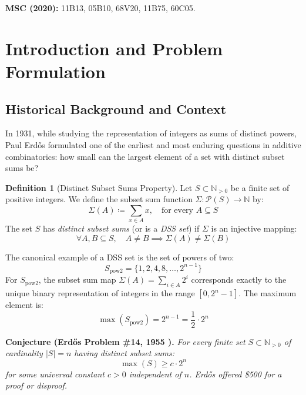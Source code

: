 \documentclass[11pt,a4paper]{article}
\theoremstyle{definition}
\newtheorem{definition}[theorem]{Definition}
\begin{document}
\noindent\textbf{MSC (2020):} 11B13, 05B10, 68V20, 11B75, 60C05.

\tableofcontents
\newpage

\section{Introduction and Problem Formulation}

\subsection{Historical Background and Context}
In 1931, while studying the representation of integers as sums of distinct powers, Paul Erd\H{o}s \cite{erdos1955} formulated one of the earliest and most enduring questions in additive combinatorics: how small can the largest element of a set with distinct subset sums be?

\begin{definition}[Distinct Subset Sums Property]\label{def:dss}
Let $S \subset \mathbb{N}_{>0}$ be a finite set of positive integers. We define the subset sum function $\Sigma : \mathcal{P}(S) \to \mathbb{N}$ by:
\begin{equation}\label{eq:subset_sum_def}
\Sigma(A) \coloneqq \sum_{x \in A} x, \quad \text{for every } A \subseteq S
\end{equation}
The set $S$ has \emph{distinct subset sums} (or is a \emph{DSS set}) if $\Sigma$ is an injective mapping:
\begin{equation}\label{eq:injectivity}
\forall A, B \subseteq S, \quad A \ne B \implies \Sigma(A) \ne \Sigma(B)
\end{equation}
\end{definition}

The canonical example of a DSS set is the set of powers of two:
\[ S_{\text{pow2}} = \{1, 2, 4, 8, \dots, 2^{n-1}\} \]
For $S_{\text{pow2}}$, the subset sum map $\Sigma(A) = \sum_{i \in A} 2^i$ corresponds exactly to the unique binary representation of integers in the range $[0, 2^n - 1]$. The maximum element is:
\[ \max(S_{\text{pow2}}) = 2^{n-1} = \frac{1}{2} \cdot 2^n \]

\noindent\textbf{Conjecture (Erd\H{o}s Problem \#14, 1955 \cite{erdos1955}).} \textit{For every finite set $S \subset \mathbb{N}_{>0}$ of cardinality $|S| = n$ having distinct subset sums:}
\begin{equation}\label{eq:erdos_conj}
\max(S) \ge c \cdot 2^n
\end{equation}
\textit{for some universal constant $c > 0$ independent of $n$. Erd\H{o}s offered \$500 for a proof or disproof.}
\end{document}
